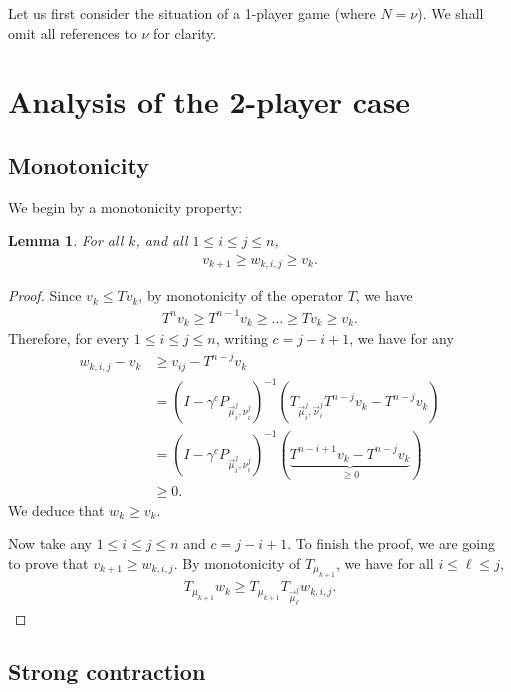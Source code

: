 \documentclass{article}
\newtheorem{lemma}{Lemma}
\begin{document}
Let us first consider the situation of a 1-player game (where $N={\nu}$). We shall omit all references to $\nu$ for clarity.



\section{Analysis of the 2-player case}

\subsection{Monotonicity}

We begin by a monotonicity property:
\begin{lemma}
  For all $k$, and all $1 \le i \le j \le n$,
  \begin{align}
    v_{k+1} \ge w_{k,i,j} \ge v_k.
  \end{align}

\end{lemma}
\begin{proof}
  Since $v_k \le T v_k$, by monotonicity of the operator $T$, we have
  \begin{align}
    T^n v_k \ge T^{n-1}v_k \ge \dots \ge T v_k  \ge v_k.
  \end{align}
Therefore,  for every $1 \le i \le j \le n$, writing $c=j-i+1$, we have for any 
\begin{align}
  w_{k,i,j} - v_k &\ge v_{ij} - T^{n-j}v_k \\
  & = (I-\gamma^c P_{\vec\mu_i^j,\nu_i^j})^{-1}(T_{\vec\mu_i^j,\vec\nu_i^j}T^{n-j}v_k - T^{n-j}v_k ) \\
  & = (I-\gamma^c P_{\vec\mu_i^j,\nu_i^j})^{-1}( \underbrace{T^{n-i+1}v_k - T^{n-j}v_k}_{\ge 0} ) \\
  & \ge 0.
\end{align}
We deduce that $w_k \ge v_k$.

Now take any $1 \le i \le j \le n$ and $c=j-i+1$. To finish the proof, we are going to prove that $v_{k+1} \ge w_{k,i,j}$.
By monotonicity of $T_{\mu_{k+1}}$, we have for all $i \le \ell \le j$,
\begin{align}
  T_{\mu_{k+1}} w_k \ge T_{\mu_{k+1}} T_{\vec\mu_\ell^j} w_{k,i,j}.
\end{align}

\end{proof}


\subsection{Strong contraction}
\end{document}

